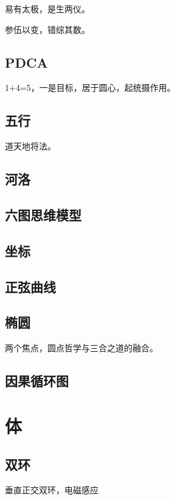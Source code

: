 易有太极，是生两仪。

参伍以变，错综其数。

\subsection{PDCA}

1+4=5，一是目标，居于圆心，起统摄作用。

\subsection{五行}

道天地将法。

\subsection{河洛}

\subsection{六图思维模型}

\subsection{坐标}

\subsection{正弦曲线}

\subsection{椭圆}

两个焦点，圆点哲学与三合之道的融合。

\subsection{因果循环图}

\section{体}

\subsection{双环}

垂直正交双环，电磁感应

